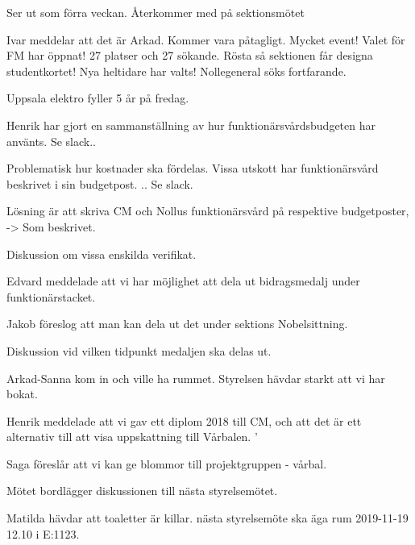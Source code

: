 \documentclass[10pt]{article}
\begin{document}
\begin{paragrafer}
\begin{paragrafer}




Ser ut som förra veckan. Återkommer med på sektionsmötet
 

Ivar meddelar att det är Arkad. Kommer vara påtagligt. Mycket event!
Valet för FM har öppnat! 27 platser och 27 sökande. Rösta så sektionen får designa studentkortet!
Nya heltidare har valts! Nollegeneral söks fortfarande. 


Uppsala elektro fyller 5 år på fredag.

\end{paragrafer}

Henrik har gjort en sammanställning av hur funktionärsvårdsbudgeten har använts. Se slack..

Problematisk hur kostnader ska fördelas. Vissa utskott har funktionärsvård beskrivet i sin budgetpost. ..  Se slack.

Lösning är att skriva CM och Nollus funktionärsvård på respektive budgetposter, -> Som beskrivet. 

Diskussion om vissa enskilda verifikat.



Edvard meddelade att vi har möjlighet att dela ut bidragsmedalj under funktionärstacket.

Jakob föreslog att man kan dela ut det under sektions Nobelsittning. 

Diskussion vid vilken tidpunkt medaljen ska delas ut. 

Arkad-Sanna kom in och ville ha rummet. Styrelsen hävdar starkt att vi har bokat. 

Henrik meddelade att vi gav ett diplom 2018 till CM, och att det är ett alternativ till att visa uppskattning till Vårbalen. '

Saga föreslår att vi kan ge blommor till projektgruppen - vårbal. 

Mötet bordlägger diskussionen till nästa styrelsemötet. 

Matilda hävdar att toaletter är killar. 
\Mba nästa styrelsemöte ska äga rum 2019-11-19 12.10 i E:1123. 



\end{paragrafer}
\end{document}
